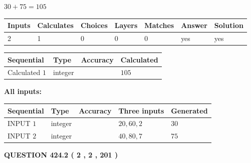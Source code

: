 \documentclass[12pt]{article}
\begin{document}
 

$ %
30 +  %
75=   %
105$
 
 
\noindent{}
 
 

 
   
   
   
   
\noindent\begin{tabular}{|l|l|l|l|l|l|l|}
 \hline
Inputs & Calculates & Choices & Layers & Matches & Answer & Solution \\ \hline
 2  & 
 1  & 
 0
  & 
 0  & 
 0  & 
  yes & 
  yes 
  \\ \hline
 \end{tabular}
   
   
   
   
\noindent{}
   
   
  
  
\noindent\begin{tabular}{|l|l|l|l|}
\hline
 Sequential & Type & Accuracy & Calculated \\ 
\hline
 
 
  Calculated $  1 $ & integer &  & 
  $ 105 $ 
 \\  \hline  
 \end{tabular}
   
   
   
   
\noindent\vspace{0.1in}\hspace{-0.08in} {\textbf{\Large{All inputs: }}}
   
   
  
  
\noindent\begin{tabular}{|l|l|l|l|l|}
\hline
 Sequential & Type & Accuracy & Three inputs & Generated \\ 
\hline
 
 
  INPUT $  1 $ & integer &  & $
 20
 , 
 60
 , 
 2
 $ & $ 30 $ 
 \\  \hline  
 
 
  INPUT $  2 $ & integer &  & $
 40
 , 
 80
 , 
 7
 $ & $ 75 $ 
 \\  \hline  
 \end{tabular}
   
   
  
\vspace{0.2in}
  
{\textbf{\Large{QUESTION
424.2 
 ( 2 , 2 , 201 )
}}}
  
\end{document}
